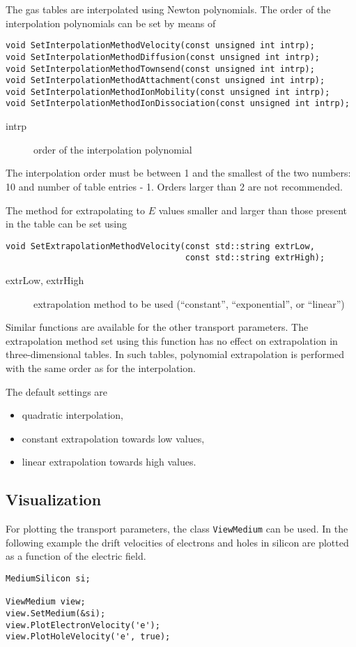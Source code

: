 The gas tables are interpolated using Newton polynomials. 
The order of the interpolation polynomials can be set by means of
\begin{lstlisting}
void SetInterpolationMethodVelocity(const unsigned int intrp);
void SetInterpolationMethodDiffusion(const unsigned int intrp);
void SetInterpolationMethodTownsend(const unsigned int intrp);
void SetInterpolationMethodAttachment(const unsigned int intrp);
void SetInterpolationMethodIonMobility(const unsigned int intrp);
void SetInterpolationMethodIonDissociation(const unsigned int intrp);
\end{lstlisting}
\begin{description}
\item[intrp]
order of the interpolation polynomial 
\end{description}
The interpolation order must be between 1 and the smallest of the two 
numbers: 10 and number of table entries - 1. 
Orders larger than 2 are not recommended.

The method for extrapolating to \(E\) values smaller and larger 
than those present in the table can be set using 
\begin{lstlisting}
void SetExtrapolationMethodVelocity(const std::string extrLow,
                                    const std::string extrHigh);
\end{lstlisting}
\begin{description}
\item[extrLow, extrHigh] extrapolation method to be used 
(``constant'', ``exponential'', or ``linear'')
\end{description}
Similar functions are available for the other transport parameters. 
The extrapolation method set using this function has no effect on 
extrapolation in three-dimensional tables. 
In such tables, polynomial extrapolation is performed with the same 
order as for the interpolation.

The default settings are
\begin{itemize}
  \item
  quadratic interpolation,
  \item
  constant extrapolation towards low values,
  \item
  linear extrapolation towards high values.
\end{itemize}

\subsection{Visualization}
For plotting the transport parameters, the class
\texttt{ViewMedium} can be used. In the following example the 
drift velocities of electrons and holes in silicon are plotted as a 
function of the electric field.
\begin{lstlisting}
MediumSilicon si;

ViewMedium view;
view.SetMedium(&si);
view.PlotElectronVelocity('e');
view.PlotHoleVelocity('e', true);
\end{lstlisting}

